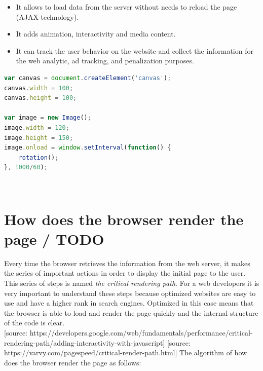 \begin{itemize}
    \item It allows to load data from the server without needs to reload the page (AJAX technology).
    \item It adds animation, interactivity and media content.
    \item It can track the user behavior on the website and collect the information for the web analytic, ad tracking, and penalization purposes.
\end{itemize}

\begin{lstlisting}[language=JavaScript, caption={Small example of JavaScript code}, label={lst:js}, captionpos=b]
var canvas = document.createElement('canvas');
canvas.width = 100;
canvas.height = 100;

var image = new Image();
image.width = 120;
image.height = 150;
image.onload = window.setInterval(function() {
    rotation();
}, 1000/60);
\end{lstlisting}\\


\section{How does the browser render the page / TODO}
\label{sec:browser}

Every time the browser retrieves the information from the web server, it makes the series of important actions in order to display the initial page to the user. This series of steps is named \textit{the critical rendering path}. For a web developers it is very important to understand these steps because optimized websites are easy to use and have a higher rank in search engines. Optimized in this case means that the browser is able to load and render the page quickly and the internal structure of the code is clear.\\

[source: https://developers.google.com/web/fundamentals/performance/critical-rendering-path/adding-interactivity-with-javascript]
[source: https://varvy.com/pagespeed/critical-render-path.html]
The algorithm of how does the browser render the page as follows:

